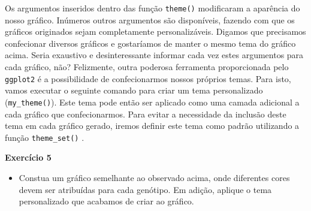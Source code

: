 \documentclass[
]{book}
\newenvironment{Shaded}{\begin{snugshade}}{\end{snugshade}}
\newcommand{\CommentTok}[1]{\textcolor[rgb]{0.56,0.35,0.01}{\textit{#1}}}
\newcommand{\ControlFlowTok}[1]{\textcolor[rgb]{0.13,0.29,0.53}{\textbf{#1}}}
\newcommand{\DataTypeTok}[1]{\textcolor[rgb]{0.13,0.29,0.53}{#1}}
\newcommand{\DecValTok}[1]{\textcolor[rgb]{0.00,0.00,0.81}{#1}}
\newcommand{\FloatTok}[1]{\textcolor[rgb]{0.00,0.00,0.81}{#1}}
\newcommand{\KeywordTok}[1]{\textcolor[rgb]{0.13,0.29,0.53}{\textbf{#1}}}
\newcommand{\NormalTok}[1]{#1}
\newcommand{\OperatorTok}[1]{\textcolor[rgb]{0.81,0.36,0.00}{\textbf{#1}}}
\newcommand{\OtherTok}[1]{\textcolor[rgb]{0.56,0.35,0.01}{#1}}
\newcommand{\StringTok}[1]{\textcolor[rgb]{0.31,0.60,0.02}{#1}}
\providecommand{\tightlist}{%
  \setlength{\itemsep}{0pt}\setlength{\parskip}{0pt}}
\begin{document}
Os argumentos inseridos dentro das função \texttt{theme()} modificaram a aparência do nosso gráfico. Inúmeros outros argumentos são disponíveis, fazendo com que os gráficos originados sejam completamente personalizáveis. Digamos que precisamos confecionar diversos gráficos e gostaríamos de manter o mesmo tema do gráfico acima. Seria exaustivo e desinteressante informar cada vez estes argumentos para cada gráfico, não? Felizmente, outra poderosa ferramenta proporcionada pelo \texttt{ggplot2} é a possibilidade de confecionarmos nossos próprios temas. Para isto, vamos executar o seguinte comando para criar um tema personalizado (\texttt{my\_theme()}). Este tema pode então ser aplicado como uma camada adicional a cada gráfico que confecionarmos. Para evitar a necessidade da inclusão deste tema em cada gráfico gerado, iremos definir este tema como padrão utilizando a função \texttt{theme\_set()} .


\begin{Shaded}
\end{Shaded}

\begin{tarefa}
\textbf{Exercício 5}

\begin{itemize}
\tightlist
\item
  Constua um gráfico semelhante ao observado acima, onde diferentes cores devem ser atribuídas para cada genótipo. Em adição, aplique o tema personalizado que acabamos de criar ao gráfico.
\end{itemize}
\end{tarefa}
\end{document}
